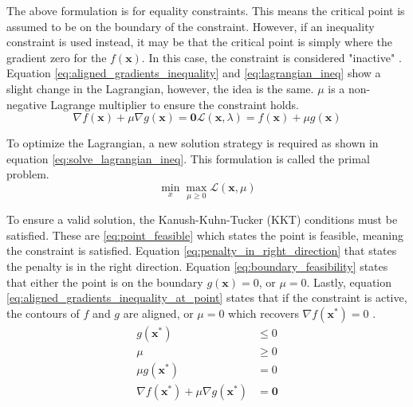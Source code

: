 The above formulation is for equality constraints. This means the critical point is assumed to be on the boundary of the constraint. However, if an inequality constraint is used instead, it may be that the critical point is simply where the gradient zero for the $f(\mathbf x)$. In this case, the constraint is considered "inactive" \cite{Kochenderfer_Wheeler_2019}. Equation \ref{eq:aligned_gradients_inequality} and \ref{eq:lagrangian_ineq} show a slight change in the Lagrangian, however, the idea is the same. $\mu$ is a non-negative Lagrange multiplier to ensure the constraint holds. 
\begin{subequations}
	\begin{equation}
		\nabla f(\mathbf{x})+\mu\nabla g(\mathbf{x}) = \mathbf 0
		\label{eq:aligned_gradients_inequality}
	\end{equation}
	\begin{equation}
		\mathcal{L}(\mathbf{x},\lambda) = f(\mathbf{x}) + \mu g(\mathbf{x})
		\label{eq:lagrangian_ineq}
	\end{equation}
\end{subequations}

To optimize the Lagrangian, a new solution strategy is required as shown in equation \ref{eq:solve_lagrangian_ineq}. This formulation is called the primal problem.
\begin{equation}
	\min_x \max_{\mu\geq 0}\mathcal{L}(\mathbf x, \mu)
	\label{eq:solve_lagrangian_ineq}
\end{equation}

To ensure a valid solution, the Kanush-Kuhn-Tucker (KKT) conditions \cite{Kuhn_Tucker_2013} must be satisfied. These are \ref{eq:point_feasible} which states the point is feasible, meaning the constraint is satisfied. Equation \ref{eq:penalty_in_right_direction} that states the penalty is in the right direction. Equation \ref{eq:boundary_feasibility} states that either the point is on the boundary $g(\mathbf x) = 0$, or $\mu = 0$. Lastly, equation \ref{eq:aligned_gradients_inequality_at_point} states that if the constraint is active, the contours of $f$ and $g$ are aligned, or $\mu = 0$ which recovers $\nabla f(\mathbf x^*) = 0$ \cite{Kochenderfer_Wheeler_2019}. 
\begin{subequations}
	\begin{alignat}{4}
		g(\mathbf x^*) &\leq 0
		\label{eq:point_feasible} \\
		\mu &\geq 0
		\label{eq:penalty_in_right_direction} \\
		\mu g(\mathbf x^*) &= 0
		\label{eq:boundary_feasibility} \\
		\nabla f(\mathbf x^*) + \mu \nabla g(\mathbf x^*) &= \mathbf 0
		\label{eq:aligned_gradients_inequality_at_point}
	\end{alignat}
\end{subequations}

